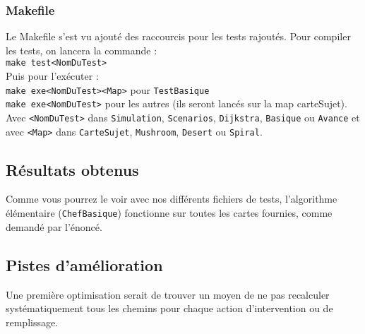 \documentclass[a4paper,8pt]{article} %
\begin{document}
\subsubsection{Makefile}
Le Makefile s'est vu ajouté des raccourcis pour les tests rajoutés.
Pour compiler les tests, on lancera la commande : \\
\texttt{make test<NomDuTest>}\\
Puis pour l'exécuter : \\
\texttt{make exe<NomDuTest><Map>} pour \texttt{TestBasique}\\
\texttt{make exe<NomDuTest>} pour les autres (ils seront lancés sur la map carteSujet).\\

Avec \texttt{<NomDuTest>} dans \texttt{Simulation}, \texttt{Scenarios}, \texttt{Dijkstra}, \texttt{Basique} ou \texttt{Avance} et avec 
\texttt{<Map>} dans \texttt{CarteSujet}, \texttt{Mushroom}, \texttt{Desert} ou \texttt{Spiral}.

\subsection{Résultats obtenus}
Comme vous pourrez le voir avec nos différents fichiers de tests, l'algorithme élémentaire (\texttt{ChefBasique}) fonctionne sur toutes les cartes 
fournies, comme demandé par l'énoncé.

\subsection{Pistes d'amélioration}
Une première optimisation serait de trouver un moyen de ne pas recalculer systématiquement tous les chemins pour chaque action d'intervention ou de remplissage.
\end{document}
